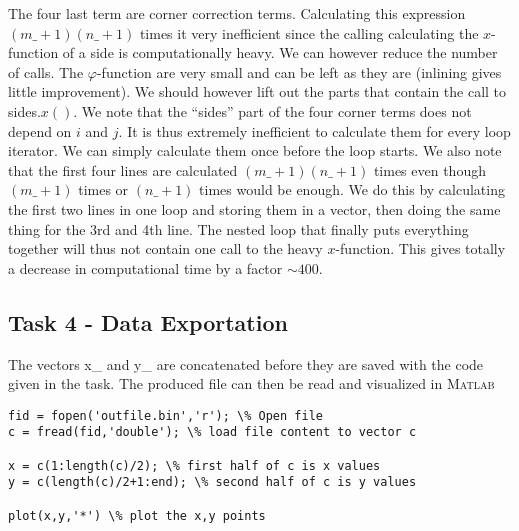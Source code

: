 \documentclass[paper=a4, fontsize=12pt]{article} %
\begin{document}
The four last term are corner correction terms. Calculating this expression $(m\_+1)(n\_+1)$ times it very inefficient since the calling calculating the $x$-function of a side is computationally heavy. We can however reduce the number of calls. The $\varphi$-function are very small and can be left as they are (inlining gives little improvement). We should however lift out the parts that contain the call to sides.$x()$. We note that the ``sides'' part of the four corner terms does not depend on $i$ and $j$. It is thus extremely inefficient to calculate them for every loop iterator. We can simply calculate them once before the loop starts. We also note that the first four lines are calculated $(m\_+1)(n\_+1)$ times even though $(m\_+1)$ times or $(n\_+1)$ times would be enough. We do this by calculating the first two lines in one loop and storing them in a vector, then doing the same thing for the 3rd and 4th line. The nested loop that finally puts everything together will thus not contain one call to the heavy $x$-function. This gives totally a decrease in computational time by a factor $\sim 400$.\\

\subsection*{Task 4 - Data Exportation}

The vectors x\_ and y\_ are concatenated before they are saved with the code given in the task. The produced file can then be read and visualized in \textsc{Matlab} 

\begin{lstlisting}
fid = fopen('outfile.bin','r'); \% Open file
c = fread(fid,'double'); \% load file content to vector c

x = c(1:length(c)/2); \% first half of c is x values
y = c(length(c)/2+1:end); \% second half of c is y values

plot(x,y,'*') \% plot the x,y points 
 \end{lstlisting}  
\end{document}
